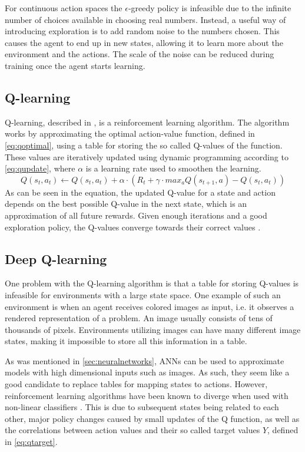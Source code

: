 \documentclass{kththesis}
\begin{document}
For continuous action spaces the $\epsilon$-greedy policy is infeasible due to the infinite number of choices available in choosing real numbers. Instead, a useful way of introducing exploration is to add random noise to the numbers chosen. This causes the agent to end up in new states, allowing it to learn more about the environment and the actions. The scale of the noise can be reduced during training once the agent starts learning. \parencite{lillicrap2015continuous}

\subsection{Q-learning}
\label{subsec:qlearning}
Q-learning, described in \textcite{watkins1992q}, is a reinforcement learning algorithm. The algorithm works by approximating the optimal action-value function, defined in \autoref{eq:qoptimal}, using a table for storing the so called Q-values of the function. These values are iteratively updated using dynamic programming according to \autoref{eq:qupdate}, where $\alpha$ is a learning rate used to smoothen the learning. 
\begin{equation}
\label{eq:qupdate}
Q(s_t, a_t) \leftarrow Q(s_t, a_t) + \alpha \cdot (R_t + \gamma \cdot max_a Q(s_{t+1}, a) - Q(s_t, a_t))
\end{equation}
As can be seen in the equation, the updated Q-value for a state and action depends on the best possible Q-value in the next state, which is an approximation of all future rewards. Given enough iterations and a good exploration policy, the Q-values converge towards their correct values \parencite{watkins1992q}.

\subsection{Deep Q-learning}
\label{subsec:deepqlearning}
One problem with the Q-learning algorithm is that a table for storing Q-values is infeasible for environments with a large state space. One example of such an environment is when an agent receives colored images as input, i.e. it observes a rendered representation of a problem. An image usually consists of tens of thousands of pixels. Environments utilizing images can have many different image states, making it impossible to store all this information in a table.

As was mentioned in \autoref{sec:neuralnetworks}, ANNs can be used to approximate models with high dimensional inputs such as images. As such, they seem like a good candidate to replace tables for mapping states to actions. However, reinforcement learning algorithms have been known to diverge when used with non-linear classifiers \parencite{tsitsiklis1997analysis}. This is due to subsequent states being related to each other, major policy changes caused by small updates of the Q function, as well as the correlations between action values and their so called target values $Y$, defined in \autoref{eq:qtarget}.
\end{document}
